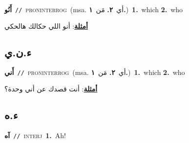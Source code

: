 \documentclass[10pt,a4paper,twoside]{article} %
\begin{document}
\begin{multicols}{2}
{\setlength\topsep{0pt}\textbf{\foreignlanguage{arabic}{أَنُو}}\ {\color{gray}\texttt{//}\color{black}}\ \textsc{pron\textunderscore interrog}\ \color{gray}(msa. \foreignlanguage{arabic}{أي}~\foreignlanguage{arabic}{\textbf{٢.}}  \foreignlanguage{arabic}{مَن}~\foreignlanguage{arabic}{\textbf{١.}})\color{black}\ \textbf{1.}~which  \textbf{2.}~who\  \begin{flushright}\color{gray}\foreignlanguage{arabic}{\textbf{\underline{\foreignlanguage{arabic}{أمثلة}}}: أنو اللي حكالك هالحكي}\end{flushright}\color{black}} \vspace{2mm}

\vspace{-3mm}
\subsection*{\color{blue}\foreignlanguage{arabic}{ء.ن.ي}\color{blue}{ (ntws)}} 

{\setlength\topsep{0pt}\textbf{\foreignlanguage{arabic}{أَني}}\ {\color{gray}\texttt{//}\color{black}}\ \textsc{pron\textunderscore interrog}\ \color{gray}(msa. \foreignlanguage{arabic}{أي}~\foreignlanguage{arabic}{\textbf{٢.}}  \foreignlanguage{arabic}{مَن}~\foreignlanguage{arabic}{\textbf{١.}})\color{black}\ \textbf{1.}~which  \textbf{2.}~who\  \begin{flushright}\color{gray}\foreignlanguage{arabic}{\textbf{\underline{\foreignlanguage{arabic}{أمثلة}}}: أنت قصدك عن أني وحدة؟}\end{flushright}\color{black}} \vspace{2mm}

\vspace{-3mm}
\subsection*{\color{blue}\foreignlanguage{arabic}{ء.ه}\color{blue}{ (ntws)}} 

{\setlength\topsep{0pt}\textbf{\foreignlanguage{arabic}{آه}}\ {\color{gray}\texttt{//}\color{black}}\ \textsc{interj}\ \textbf{1.}~Ah!\ } \vspace{2mm}


\end{multicols}
\end{document}
